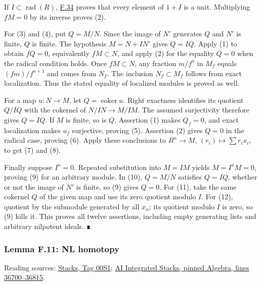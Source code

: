 \documentclass[11pt,a4paper,openany]{report}
\begin{document}
If \(I\subset\operatorname{rad}(R)\), \hyperref[AG-RG-S05-algebra-lemma-contained-in-radical]{F.34} proves that every element of \(1+I\) is a unit. Multiplying \(fM=0\) by its inverse proves (2).

For (3) and (4), put \(Q=M/N\). Since the image of \(N'\) generates \(Q\) and \(N'\) is finite, \(Q\) is finite. The hypothesis \(M=N+IN'\) gives \(Q=IQ\). Apply (1) to obtain \(fQ=0\), equivalently \(fM\subset N\), and apply (2) for the equality \(Q=0\) when the radical condition holds. Once \(fM\subset N\), any fraction \(m/f^a\) in \(M_f\) equals \((fm)/f^{a+1}\) and comes from \(N_f\). The inclusion \(N_f\subset M_f\) follows from exact localization. Thus the stated equality of localized modules is proved as well.

For a map \(u:N\to M\), let \(Q=\operatorname{coker}u\). Right exactness identifies its quotient \(Q/IQ\) with the cokernel of \(N/IN\to M/IM\). The assumed surjectivity therefore gives \(Q=IQ\). If \(M\) is finite, so is \(Q\). Assertion (1) makes \(Q_f=0\), and exact localization makes \(u_f\) surjective, proving (5). Assertion (2) gives \(Q=0\) in the radical case, proving (6). Apply these conclusions to \(R^n\to M\), \((r_i)\mapsto\sum r_ix_i\), to get (7) and (8).

Finally suppose \(I^a=0\). Repeated substitution into \(M=IM\) yields \(M=I^aM=0\), proving (9) for an arbitrary module. In (10), \(Q=M/N\) satisfies \(Q=IQ\), whether or not the image of \(N'\) is finite, so (9) gives \(Q=0\). For (11), take the same cokernel \(Q\) of the given map and use its zero quotient modulo \(I\). For (12), quotient by the submodule generated by all \(x_\alpha\); its quotient modulo \(I\) is zero, so (9) kills it. This proves all twelve assertions, including empty generating lists and arbitrary nilpotent ideals. ∎

\label{AG-RG-S05-algebra-lemma-NL-homotopy}

\subsubsection{Lemma F.11: NL homotopy}\label{AG-RG-S05-lemma-f.11-nl-homotopy}

Reading sources: \href{https://stacks.math.columbia.edu/tag/00S1}{Stacks, Tag 00S1}; \href{https://github.com/KokunoYumeto/unofficial-stacks-project-ai-drafts/blob/565b10e987aba5969b21145a0833f42d69f96790/algebra.tex\#L36700-L36815}{AI Integrated Stacks, pinned Algebra, lines 36700--36815}.
\end{document}
